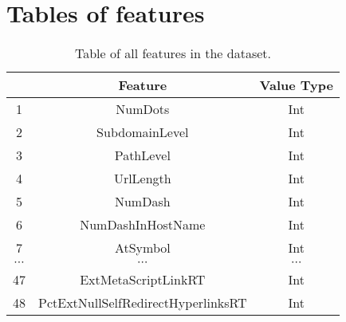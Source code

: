 \section{Tables of features}
\begin{table}
    \centering
    \begin{tabular}{|c|c|c|}
        \hline
         & Feature & Value Type \\
        \hline
        1 & NumDots & Int \\
        \hline
        2 & SubdomainLevel & Int \\
        \hline
        3 & PathLevel & Int \\
        \hline
        4 & UrlLength & Int \\
        \hline
        5 & NumDash & Int \\
        \hline
        6 & NumDashInHostName & Int \\
        \hline
        7 & AtSymbol & Int \\
        \hline
        $\cdots$ & $\cdots$ & $\cdots$ \\
        \hline
        47 & ExtMetaScriptLinkRT & Int \\
        \hline
        48 & PctExtNullSelfRedirectHyperlinksRT & Int \\
        \hline
    \end{tabular}
    \caption{Table of all features in the dataset.}\label{tab:all_features}
\end{table}


